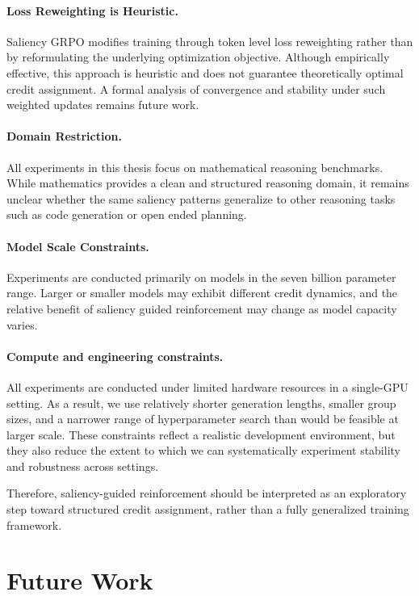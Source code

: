 \documentclass[12pt]{report}
\begin{document}
\paragraph{Loss Reweighting is Heuristic.}
Saliency GRPO modifies training through token level loss reweighting rather than by reformulating the underlying optimization objective. Although empirically effective, this approach is heuristic and does not guarantee theoretically optimal credit assignment. A formal analysis of convergence and stability under such weighted updates remains future work.

\paragraph{Domain Restriction.}
All experiments in this thesis focus on mathematical reasoning benchmarks. While mathematics provides a clean and structured reasoning domain, it remains unclear whether the same saliency patterns generalize to other reasoning tasks such as code generation or open ended planning.

\paragraph{Model Scale Constraints.}
Experiments are conducted primarily on models in the seven billion parameter range. Larger or smaller models may exhibit different credit dynamics, and the relative benefit of saliency guided reinforcement may change as model capacity varies.

\paragraph{Compute and engineering constraints.}
All experiments are conducted under limited hardware resources in a single-GPU setting. As a result, we use relatively shorter generation lengths, smaller group sizes, and a narrower range of hyperparameter search than would be feasible at larger scale. 
These constraints reflect a realistic development environment, but they also reduce the extent to which we can systematically experiment stability and robustness across settings. 

\bigskip
Therefore, saliency-guided reinforcement should be interpreted as an exploratory step toward structured credit assignment, rather than a fully generalized training framework.

\section{Future Work}
\end{document}
